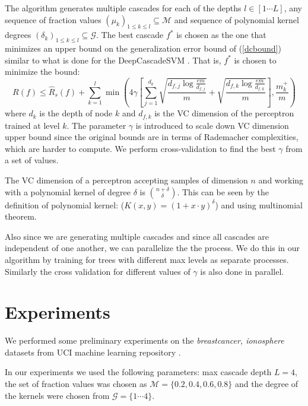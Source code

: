 \documentclass[paper=letter, fontsize=11pt]{scrartcl}
\numberwithin{equation}{section}		%
\numberwithin{figure}{section}			%
\numberwithin{table}{section}				%
\begin{document}
The algorithm generates multiple cascades for each of the depths $l \in [1 \cdots L]$, any sequence of fraction values $(\mu_k)_{1 \leq k \leq l} \subseteq \mathcal{M}$ and sequence of polynomial kernel degrees $(\delta_k)_{1 \leq k \leq l} \subseteq \mathcal{G}$. The best cascade $f^*$ is chosen as the one that minimizes an upper bound on the generalization error bound of (\ref{dcbound}) similar to what is done for the DeepCascadeSVM \cite{deepcascades}. That is, $f^*$ is chosen to minimize the bound:
\begin{equation}
R(f) \leq \widehat{R}_s(f) + \sum_{k=1}^{l} \min \left( 4\gamma \left[ \sum_{j=1}^{d_k} \sqrt{\frac{d_{f,j} \log\frac{em}{d_{f,j}}}{m}} + \sqrt{\frac{d_{f,k} \log\frac{em}{d_{f,k}}}{m}} \right] , \frac{m_k^+}{m} \right)
\label{dcvcbound}
\end{equation}
where $d_k$ is the depth of node $k$ and $d_{f,k}$ is the VC dimension of the perceptron trained at level $k$. The parameter $\gamma$ is introduced to scale down VC dimension upper bound since the original bounds are in terms of Rademacher complexities, which are harder to compute. We perform cross-validation to find the best $\gamma$ from a set of values. %

The VC dimension of a perceptron accepting samples of dimension $n$ and working with a polynomial kernel of degree $\delta$ is $\binom{n+\delta}{\delta}$. This can be seen by the definition of polynomial kernel: ($K(x,y) = (1+x \cdot y)^\delta$) and using multinomial theorem.

Also since we are generating multiple cascades and since all cascades are independent of one another, we can parallelize the the process. We do this in our algorithm by training for trees with different max levels as separate processes. Similarly the cross validation for different values of $\gamma$ is also done in parallel.

\section{Experiments}
We performed some preliminary experiments on the \emph{breastcancer, ionosphere} datasets from UCI machine learning repository \cite{Lichman:2013}.

In our experiments we used the following parameters: max cascade depth $L=4$, the set of fraction values was chosen as $\mathcal{M} = \{ 0.2,0.4,0.6,0.8 \}$ and the degree of the kernels were chosen from $\mathcal{G} = \{ 1 \cdots 4 \}$.
\end{document}

